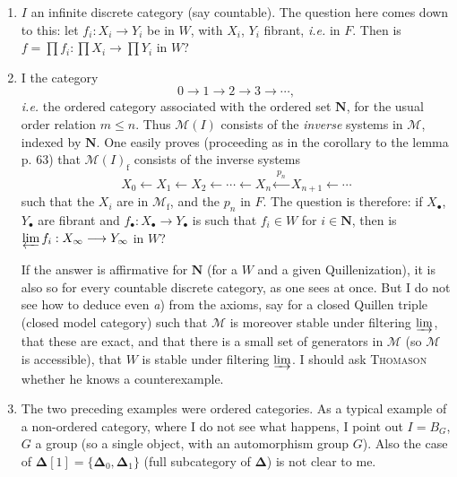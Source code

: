 \documentclass[11pt]{article}
\newcommand{\printedpage}[1]{\marginpar{\footnotesize p.~#1}}
\newcommand{\msp}[1]{\marginpar{\footnotesize [#1]}}
\newcommand{\M}{\mathcal{M}}
\newcommand{\rf}{\mathrm{f}}
\begin{document}
\begin{enumerate}
\item[\textit{a})] $I$ an infinite discrete category (say countable). The question here comes down to this: let $f_i : X_i \longrightarrow Y_i$ be in $W$, with $X_i$, $Y_i$ fibrant, \textit{i.e.} in $F$. Then is $f = \prod f_i : \prod X_i \longrightarrow \prod Y_i$ in $W$?

\msp{page 73}

\item[\textit{b})] I the category %
\[
0 \longrightarrow 1 \longrightarrow 2 \longrightarrow 3 \longrightarrow \cdots,
\]
\textit{i.e.} the ordered category associated with the ordered set $\mathbf{N}$, for the usual order relation $m \leq n$. Thus $\M(I)$ consists of the \textit{inverse} systems in $\M$, indexed by $\mathbf{N}$. One easily proves (proceeding as in the corollary to the lemma p. 63) that $\M(I)_{\rf}$ consists of the inverse systems
\[
X_0 \longleftarrow X_1 \longleftarrow X_2 \longleftarrow \cdots \longleftarrow X_n \xleftarrow{\ p_n\ } X_{n+1} \longleftarrow \cdots
\]
such that the $X_i$ are in $\M_{\rf}$, and the $p_n$ in $F$. The question is therefore: if $X_\bullet$, $Y_\bullet$ are fibrant and $f_\bullet : X_\bullet \longrightarrow Y_\bullet$ is such that $f_i \in W$ for $i \in \mathbf{N}$, then is $\varprojlim f_i : X_\infty \longrightarrow Y_\infty$ in $W$?

If the answer is affirmative for $\mathbf{N}$ (for a $W$ and a given Quillenization), it %
is also so for every countable discrete category, as one sees at once. But I do not see how to deduce even \textit{a}) from the axioms, say for a closed Quillen triple (closed model category) such that $\M$ is moreover stable under filtering $\varinjlim$, that these are exact, and that there is
\printedpage{41}
\msp{page 74}
a small set of generators in $\M$ (so $\M$ is accessible), that $W$ is stable under filtering $\varinjlim$. I should ask \textsc{Thomason} whether he knows a counterexample. %

\item[\textit{c})] The two preceding examples were ordered categories. As a typical example of a non-ordered category, where I do not see what happens, I point out $I = B_G$, $G$ a group (so a single object, with an automorphism group $G$). Also the case of $\boldsymbol{\Delta}[1] = \{\boldsymbol{\Delta}_0, \boldsymbol{\Delta}_1\}$ (full subcategory of $\boldsymbol{\Delta}$) is not clear to me.
\end{enumerate}
\end{document}

